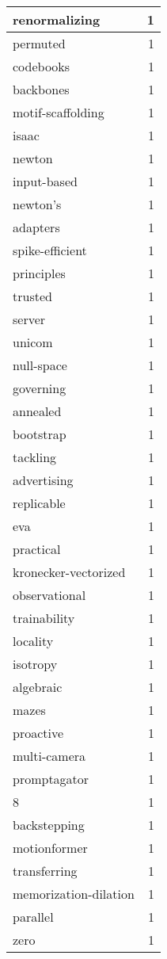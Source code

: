 \begin{table}[h]
\begin{tabular}{|l|r|}
renormalizing & 1 \\
\hline
permuted & 1 \\
\hline
codebooks & 1 \\
\hline
backbones & 1 \\
\hline
motif-scaffolding & 1 \\
\hline
isaac & 1 \\
\hline
newton & 1 \\
\hline
input-based & 1 \\
\hline
newton's & 1 \\
\hline
adapters & 1 \\
\hline
spike-efficient & 1 \\
\hline
principles & 1 \\
\hline
trusted & 1 \\
\hline
server & 1 \\
\hline
unicom & 1 \\
\hline
null-space & 1 \\
\hline
governing & 1 \\
\hline
annealed & 1 \\
\hline
bootstrap & 1 \\
\hline
tackling & 1 \\
\hline
advertising & 1 \\
\hline
replicable & 1 \\
\hline
eva & 1 \\
\hline
practical & 1 \\
\hline
kronecker-vectorized & 1 \\
\hline
observational & 1 \\
\hline
trainability & 1 \\
\hline
locality & 1 \\
\hline
isotropy & 1 \\
\hline
algebraic & 1 \\
\hline
mazes & 1 \\
\hline
proactive & 1 \\
\hline
multi-camera & 1 \\
\hline
promptagator & 1 \\
\hline
8 & 1 \\
\hline
backstepping & 1 \\
\hline
motionformer & 1 \\
\hline
transferring & 1 \\
\hline
memorization-dilation & 1 \\
\hline
parallel & 1 \\
\hline
zero & 1 \\

\end{tabular}
\end{table}
